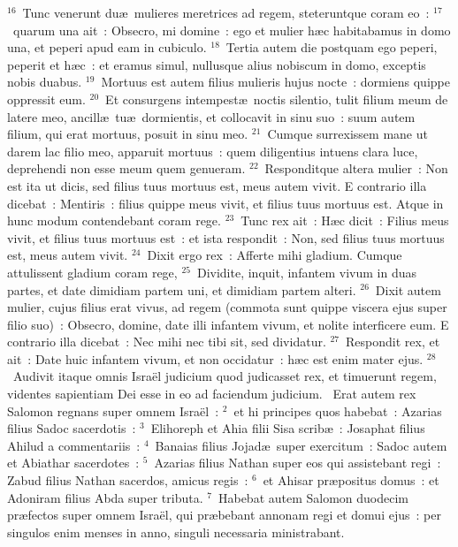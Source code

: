 ${}^{16}$~Tunc venerunt du\ae\ mulieres meretrices ad regem, steteruntque coram eo~:
${}^{17}$~quarum una ait~: Obsecro, mi domine~: ego et mulier h\ae c habitabamus in domo una, et peperi apud eam in cubiculo.
${}^{18}$~Tertia autem die postquam ego peperi, peperit et h\ae c~: et eramus simul, nullusque alius nobiscum in domo, exceptis nobis duabus.
${}^{19}$~Mortuus est autem filius mulieris hujus nocte~: dormiens quippe oppressit eum.
${}^{20}$~Et consurgens intempest\ae\ noctis silentio, tulit filium meum de latere meo, ancill\ae\ tu\ae\ dormientis, et collocavit in sinu suo~: suum autem filium, qui erat mortuus, posuit in sinu meo.
${}^{21}$~Cumque surrexissem mane ut darem lac filio meo, apparuit mortuus~: quem diligentius intuens clara luce, deprehendi non esse meum quem genueram.
${}^{22}$~Responditque altera mulier~: Non est ita ut dicis, sed filius tuus mortuus est, meus autem vivit. E contrario illa dicebat~: Mentiris~: filius quippe meus vivit, et filius tuus mortuus est. Atque in hunc modum contendebant coram rege.
${}^{23}$~Tunc rex ait~: H\ae c dicit~: Filius meus vivit, et filius tuus mortuus est~: et ista respondit~: Non, sed filius tuus mortuus est, meus autem vivit.
${}^{24}$~Dixit ergo rex~: Afferte mihi gladium. Cumque attulissent gladium coram rege,
${}^{25}$~Dividite, inquit, infantem vivum in duas partes, et date dimidiam partem uni, et dimidiam partem alteri.
${}^{26}$~Dixit autem mulier, cujus filius erat vivus, ad regem (commota sunt quippe viscera ejus super filio suo)~: Obsecro, domine, date illi infantem vivum, et nolite interficere eum. E contrario illa dicebat~: Nec mihi nec tibi sit, sed dividatur.
${}^{27}$~Respondit rex, et ait~: Date huic infantem vivum, et non occidatur~: h\ae c est enim mater ejus.
${}^{28}$~Audivit itaque omnis Isra\"el judicium quod judicasset rex, et timuerunt regem, videntes sapientiam Dei esse in eo ad faciendum judicium.
~\lettrine[lines=10,image=true,loversize=0.05,lraise=-0.03]{E}{}rat autem rex Salomon regnans super omnem Isra\"el~:
${}^{2}$~et hi principes quos habebat~: Azarias filius Sadoc sacerdotis~:
${}^{3}$~Elihoreph et Ahia filii Sisa scrib\ae~: Josaphat filius Ahilud a commentariis~:
${}^{4}$~Banaias filius Jojad\ae\ super exercitum~: Sadoc autem et Abiathar sacerdotes~:
${}^{5}$~Azarias filius Nathan super eos qui assistebant regi~: Zabud filius Nathan sacerdos, amicus regis~:
${}^{6}$~et Ahisar pr\ae positus domus~: et Adoniram filius Abda super tributa.
${}^{7}$~Habebat autem Salomon duodecim pr\ae fectos super omnem Isra\"el, qui pr\ae bebant annonam regi et domui ejus~: per singulos enim menses in anno, singuli necessaria ministrabant.
